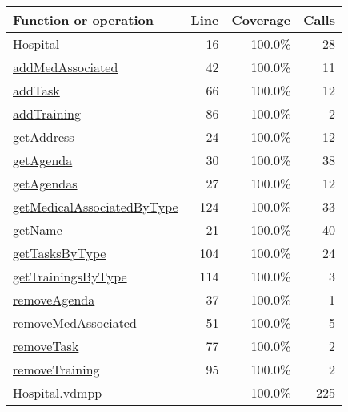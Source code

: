 \bigskip
\begin{longtable}{|l|r|r|r|}
\hline
Function or operation & Line & Coverage & Calls \\
\hline
\hline
\hyperref[Hospital:16]{Hospital} & 16&100.0\% & 28 \\
\hline
\hyperref[addMedAssociated:42]{addMedAssociated} & 42&100.0\% & 11 \\
\hline
\hyperref[addTask:66]{addTask} & 66&100.0\% & 12 \\
\hline
\hyperref[addTraining:86]{addTraining} & 86&100.0\% & 2 \\
\hline
\hyperref[getAddress:24]{getAddress} & 24&100.0\% & 12 \\
\hline
\hyperref[getAgenda:30]{getAgenda} & 30&100.0\% & 38 \\
\hline
\hyperref[getAgendas:27]{getAgendas} & 27&100.0\% & 12 \\
\hline
\hyperref[getMedicalAssociatedByType:124]{getMedicalAssociatedByType} & 124&100.0\% & 33 \\
\hline
\hyperref[getName:21]{getName} & 21&100.0\% & 40 \\
\hline
\hyperref[getTasksByType:104]{getTasksByType} & 104&100.0\% & 24 \\
\hline
\hyperref[getTrainingsByType:114]{getTrainingsByType} & 114&100.0\% & 3 \\
\hline
\hyperref[removeAgenda:37]{removeAgenda} & 37&100.0\% & 1 \\
\hline
\hyperref[removeMedAssociated:51]{removeMedAssociated} & 51&100.0\% & 5 \\
\hline
\hyperref[removeTask:77]{removeTask} & 77&100.0\% & 2 \\
\hline
\hyperref[removeTraining:95]{removeTraining} & 95&100.0\% & 2 \\
\hline
\hline
Hospital.vdmpp & & 100.0\% & 225 \\
\hline
\end{longtable}


